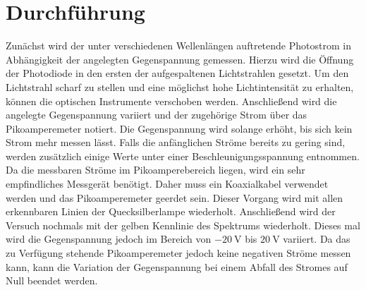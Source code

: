 
\section{Durchführung}
\label{sec:Durchführung}
Zunächst wird der unter verschiedenen Wellenlängen auftretende Photostrom in
Abhängigkeit der angelegten Gegenspannung gemessen. Hierzu wird die Öffnung der
Photodiode in den ersten der aufgespaltenen Lichtstrahlen gesetzt. Um den
Lichtstrahl scharf zu stellen und eine möglichst hohe Lichtintensität zu erhalten,
 können die optischen Instrumente verschoben werden.
 Anschließend wird die angelegte Gegenspannung variiert und der zugehörige Strom
 über das Pikoamperemeter notiert. Die Gegenspannung wird solange erhöht, bis sich
 kein Strom mehr messen lässt. Falls die anfänglichen Ströme bereits zu gering sind,
 werden zusätzlich einige Werte unter einer Beschleunigungsspannung entnommen.
 Da die messbaren Ströme im Pikoamperebereich liegen,
 wird ein sehr empfindliches Messgerät benötigt. Daher muss ein Koaxialkabel verwendet werden
 und das Pikoamperemeter geerdet sein. Dieser Vorgang wird mit allen erkennbaren
 Linien der Quecksilberlampe wiederholt.
 Anschließend wird der Versuch nochmals mit der gelben Kennlinie des Spektrums
 wiederholt. Dieses mal wird die Gegenspannung jedoch im Bereich von
 $\SI{-20}{\volt}$ bis $\SI{20}{\volt}$ variiert. Da das zu Verfügung stehende
 Pikoamperemeter jedoch keine negativen Ströme messen kann, kann die Variation der
 Gegenspannung bei einem Abfall des Stromes auf Null beendet werden.
